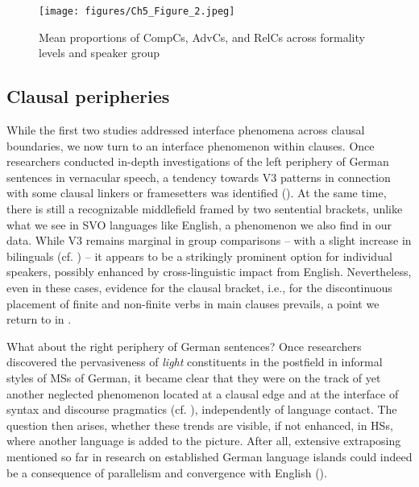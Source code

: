 \documentclass[output=paper]{langscibook}
\begin{document}
\begin{figure}
\texttt{[image: figures/Ch5\_Figure\_2.jpeg]}
\caption{Mean proportions of CompCs, AdvCs, and RelCs across formality levels and speaker group \citep[10]{TsehayeEtAl2021}}
\label{fig:tsehaye:2}
\end{figure}


\subsection{Clausal peripheries}
\label{sec:tsehaye:5.3}
While the first two studies addressed interface phenomena across clausal boundaries, we now turn to an interface phenomenon within clauses. Once researchers conducted in-depth investigations of the left periphery of German sentences in vernacular speech, a tendency towards V3 patterns in connection with some clausal linkers or framesetters was identified (\citealt{SluckinBunk2023, Wiese2013, WieseMüller2018, Bunk2020, Walkden2017, teVelde2017}). At the same time, there is still a recognizable middlefield framed by two sentential brackets, unlike what we see in SVO languages like English, a phenomenon we also find in our data. While V3 remains marginal in group comparisons – with a slight increase in bilinguals (cf. \citealt{WieseEtAl2022}) – it appears to be a strikingly prominent option for individual speakers, possibly enhanced by cross-linguistic impact from English. Nevertheless, even in these cases, evidence for the clausal bracket, i.e., for the discontinuous placement of finite and non-finite verbs in main clauses prevails, a point we return to in .

What about the right periphery of German sentences? Once researchers discovered the pervasiveness of \textit{light} constituents in the postfield in informal styles of MSs of German, it became clear that they were on the track of yet another neglected phenomenon located at a clausal edge and at the interface of syntax and discourse pragmatics (cf. \citealt{Vinckel-Roisin2015}), independently of language contact. The question then arises, whether these trends are visible, if not enhanced, in HSs, where another language is added to the picture. After all, extensive extraposing mentioned so far in research on established German language islands could indeed be a consequence of parallelism and convergence with English (\citealt{Clyne2003, WestphalFitch2011}).
\end{document}
